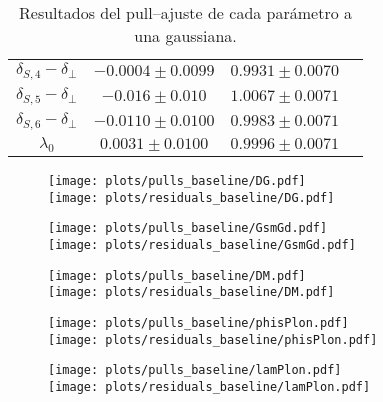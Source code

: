 \begin{subappendices}
\begin{table}[H]
\begin{tabular}{cccc}
$\delta_{S,4}- \delta_{\perp}$ &  $-0.0004 \pm 0.0099$ &  $0.9931 \pm 0.0070$ & \\
$\delta_{S,5}- \delta_{\perp}$ &  $-0.016 \pm 0.010$ &  $1.0067 \pm 0.0071$ & \\
$\delta_{S,6}- \delta_{\perp}$ &  $-0.0110 \pm 0.0100$ &  $0.9983 \pm 0.0071$ & \\
$\lambda_0$ &  $0.0031 \pm 0.0100$ &  $0.9996 \pm 0.0071$ & \\
  \bottomrule  
  \end{tabular}
  \caption{Resultados del pull--ajuste de cada parámetro a una gaussiana.}
\end{table}













\begin{figure}[H]
  \centering
  \begin{multicols}{2}
  \texttt{[image: plots/pulls\_baseline/DG.pdf]}  \\
  \texttt{[image: plots/residuals\_baseline/DG.pdf]}
  \end{multicols}  
  \begin{multicols}{2}
  \texttt{[image: plots/pulls\_baseline/GsmGd.pdf]}  \\
  \texttt{[image: plots/residuals\_baseline/GsmGd.pdf]}
  \end{multicols}  
  \begin{multicols}{2}
  \texttt{[image: plots/pulls\_baseline/DM.pdf]}  \\
  \texttt{[image: plots/residuals\_baseline/DM.pdf]}
  \end{multicols}  
  \begin{multicols}{2}
  \texttt{[image: plots/pulls\_baseline/phisPlon.pdf]}  \\
  \texttt{[image: plots/residuals\_baseline/phisPlon.pdf]}
  \end{multicols}  
  \begin{multicols}{2}
  \texttt{[image: plots/pulls\_baseline/lamPlon.pdf]}  \\
  \texttt{[image: plots/residuals\_baseline/lamPlon.pdf]}
  \end{multicols}    
\end{figure}


\end{subappendices}

